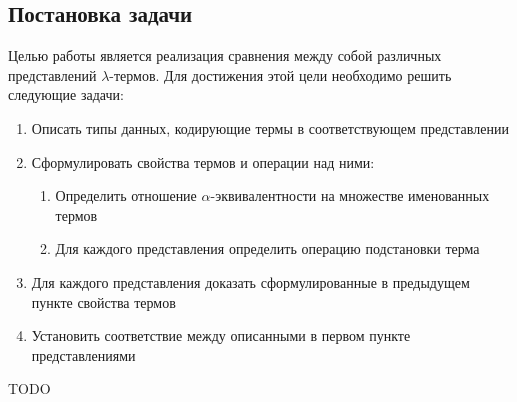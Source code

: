 \subsection{Постановка задачи}

Целью работы является реализация сравнения между собой различных представлений $\lambda$-термов. Для достижения этой цели необходимо решить следующие задачи:

\begin{enumerate}
  \item Описать типы данных, кодирующие термы в соответствующем представлении
  \item Сформулировать свойства термов и операции над ними:
    \begin{enumerate}
      \item Определить отношение $\alpha$-эквивалентности на множестве именованных термов
      \item Для каждого представления определить операцию подстановки терма
    \end{enumerate}
  \item Для каждого представления доказать сформулированные в предыдущем пункте свойства термов
  \item Установить соответствие между описанными в первом пункте представлениями
\end{enumerate}

TODO
